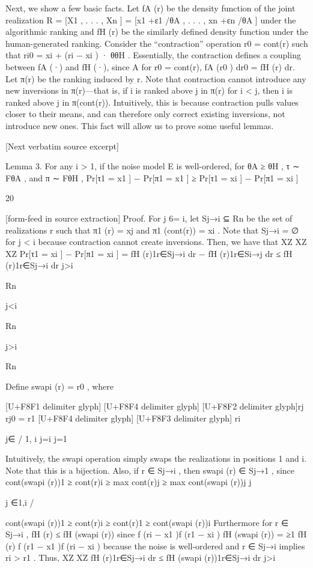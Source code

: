 \documentclass[10pt]{article}
\begin{document}
\begin{ReviewVerbatim}

Next, we show a few basic facts. Let fA (r) be the density function of the joint realization R =
[X1 , . . . , Xn ] = [x1 +ε1 /θA , . . . , xn +εn /θA ] under the algorithmic ranking and fH (r) be the similarly defined
density function under the human-generated ranking. Consider the “contraction” operation r0 = cont(r) such
that ri0 = xi + (ri − xi ) · θθH
. Essentially, the contraction defines a coupling between fA (·) and fH (·), since
A
for r0 = cont(r), fA (r0 ) dr0 = fH (r) dr. Let π(r) be the ranking induced by r. Note that contraction cannot
introduce any new inversions in π(r)—that is, if i is ranked above j in π(r) for i < j, then i is ranked above
j in π(cont(r)). Intuitively, this is because contraction pulls values closer to their means, and can therefore
only correct existing inversions, not introduce new ones. This fact will allow us to prove some useful lemmas.

[Next verbatim source excerpt]

Lemma 3. For any i > 1, if the noise model E is well-ordered, for θA ≥ θH , τ ∼ FθA , and π ∼ FθH ,
Pr[τ1 = x1 ] − Pr[π1 = x1 ] ≥ Pr[τ1 = xi ] − Pr[π1 = xi ]

20


[form-feed in source extraction]
Proof. For j 6= i, let Sj→i ⊆ Rn be the set of realizations r such that π1 (r) = xj and π1 (cont(r)) = xi . Note
that Sj→i = ∅ for j < i because contraction cannot create inversions. Then, we have that
XZ
XZ
XZ
Pr[τ1 = xi ] − Pr[π1 = xi ] =
fH (r)1r∈Sj→i dr −
fH (r)1r∈Si→j dr ≤
fH (r)1r∈Sj→i dr
j>i

Rn

j<i

Rn

j>i

Rn

Define
swapi (r) = r0 ,
where

[U+F8F1 delimiter glyph]
[U+F8F4 delimiter glyph]
[U+F8F2 delimiter glyph]rj
rj0 = r1
[U+F8F4 delimiter glyph]
[U+F8F3 delimiter glyph]
ri

j∈
/ {1, i}
j=i
j=1

Intuitively, the swapi operation simply swaps the realizations in positions 1 and i. Note that this is a
bijection. Also, if r ∈ Sj→i , then swapi (r) ∈ Sj→1 , since
cont(swapi (r))1 ≥ cont(r)i ≥ max cont(r)j ≥ max cont(swapi (r))j
j

j ∈{1,i}
/

cont(swapi (r))1 ≥ cont(r)i ≥ cont(r)1 ≥ cont(swapi (r))i
Furthermore for r ∈ Sj→i , fH (r) ≤ fH (swapi (r)) since
f (ri − x1 )f (r1 − xi )
fH (swapi (r))
=
≥1
fH (r)
f (r1 − x1 )f (ri − xi )
because the noise is well-ordered and r ∈ Sj→i implies ri > r1 . Thus,
XZ
XZ
fH (r)1r∈Sj→i dr ≤
fH (swapi (r))1r∈Sj→i dr
j>i


\end{ReviewVerbatim}
\end{document}
